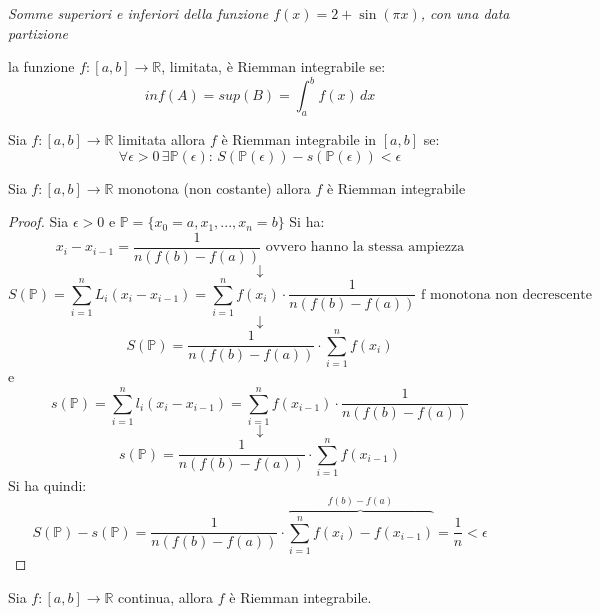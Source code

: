 \documentclass[a4paper,12pt, oneside]{book}
\begin{document}
\begin{center} \textit{Somme superiori e inferiori della funzione
    $f(x)=2+\sin(\pi x)$, con una data partizione}
\end{center}
\begin{definizione} la funzione $f:[a,b]\rightarrow\mathbb{R}$, limitata, è
  Riemman integrabile se:$$inf(A)=sup(B)=\int_{a}^{b}f(x)\,dx$$
\end{definizione}
\newpage
\begin{teorema} Sia
  $f:[a,b]\rightarrow\mathbb{R}$ limitata allora $f$ è Riemman integrabile in
  $[a,b]$ se:
  $$\forall\epsilon>0	\, \exists\mathbb{P}(\epsilon):\, S(\mathbb{P}(\epsilon))-s(\mathbb{P}(\epsilon))<\epsilon$$
\end{teorema}
\begin{teorema} Sia $f:[a,b]\rightarrow\mathbb{R}$ monotona (non costante)
  allora $f$ è Riemman integrabile
\end{teorema}
\begin{proof} Sia $\epsilon>0$ e $\mathbb{P}=\{x_0=a,x_1,...,x_n=b\}$ Si ha:
  $$x_i-x_{i-1}=\frac{1}{n(f(b)-f(a))} \mbox{ ovvero hanno la stessa ampiezza}$$
  $$\downarrow$$
  $$S(\mathbb{P})= \sum_{i=1}^{n} L_i(x_i-x_{i-1})=\sum_{i=1}^{n}f(x_i)\cdot \frac{1}{n(f(b)-f(a))} \mbox{ f monotona non decrescente}$$
  $$\downarrow$$
  $$S(\mathbb{P})=\frac{1}{n(f(b)-f(a))}\cdot\sum_{i=1}^{n}f(x_i)$$
  e
  $$s(\mathbb{P})= \sum_{i=1}^{n} l_i(x_i-x_{i-1})=\sum_{i=1}^{n}f(x_{i-1})\cdot \frac{1}{n(f(b)-f(a))}$$
  $$\downarrow$$
  $$s(\mathbb{P})=\frac{1}{n(f(b)-f(a))}\cdot\sum_{i=1}^{n}f(x_{i-1})$$
  Si ha quindi:
  $$S(\mathbb{P})-s(\mathbb{P})=\frac{1}{n(f(b)-f(a))}\cdot\overbrace{\sum_{i=1}^{n}f(x_i)-f(x_{i-1})}^{f(b)-f(a)}=\frac{1}{n}<\epsilon$$
\end{proof}
\begin{teorema} Sia $f:[a,b]\rightarrow\mathbb{R}$ continua, allora $f$ è
  Riemman integrabile.
\end{teorema}
\newpage
\end{document}
